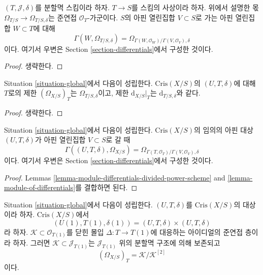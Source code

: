 \begin{lemma}
\label{lemma-module-differentials-divided-power-scheme}
$(T, \mathcal{J}, \delta)$를 분할멱 스킴이라 하자.
$T \to S$를 스킴의 사상이라 하자. 위에서 설명한 몫
$\Omega_{T/S} \to \Omega_{T/S, \delta}$는 준연접
$\mathcal{O}_T$-가군이다. $S$의 아핀 열린집합 $V \subset S$로
가는 아핀 열린집합 $W \subset T$에 대해
$$
\Gamma(W, \Omega_{T/S, \delta}) =
\Omega_{\Gamma(W, \mathcal{O}_W)/\Gamma(V, \mathcal{O}_V), \delta}
$$
이다. 여기서 우변은 Section \ref{section-differentials}에서
구성한 것이다.
\end{lemma}

\begin{proof}
생략한다.
\end{proof}

\begin{lemma}
\label{lemma-module-of-differentials}
Situation \ref{situation-global}에서 다음이 성립한다.
$\text{Cris}(X/S)$의 $(U, T, \delta)$에 대해 $T$로의 제한
$(\Omega_{X/S})_T$는 $\Omega_{T/S, \delta}$이고, 제한
$\text{d}_{X/S}|_T$는 $\text{d}_{T/S, \delta}$와 같다.
\end{lemma}

\begin{proof}
생략한다.
\end{proof}

\begin{lemma}
\label{lemma-module-of-differentials-on-affine}
Situation \ref{situation-global}에서 다음이 성립한다.
$\text{Cris}(X/S)$의 임의의 아핀 대상 $(U, T, \delta)$가
아핀 열린집합 $V \subset S$로 갈 때
$$
\Gamma((U, T, \delta), \Omega_{X/S}) =
\Omega_{\Gamma(T, \mathcal{O}_T)/\Gamma(V, \mathcal{O}_V), \delta}
$$
이다. 여기서 우변은 Section \ref{section-differentials}에서
구성한 것이다.
\end{lemma}

\begin{proof}
Lemmas \ref{lemma-module-differentials-divided-power-scheme} and
\ref{lemma-module-of-differentials}를 결합하면 된다.
\end{proof}

\begin{lemma}
\label{lemma-describe-omega-small}
Situation \ref{situation-global}에서 다음이 성립한다.
$(U, T, \delta)$를 $\text{Cris}(X/S)$의 대상이라 하자.
$\text{Cris}(X/S)$에서
$$
(U(1), T(1), \delta(1)) = (U, T, \delta) \times (U, T, \delta)
$$
라 하자. $\mathcal{K} \subset \mathcal{O}_{T(1)}$를 닫힌 몰입
$\Delta : T \to T(1)$에 대응하는 아이디얼의 준연접 층이라 하자.
그러면
$\mathcal{K} \subset \mathcal{J}_{T(1)}$는 $\mathcal{J}_{T(1)}$ 위의
분할멱 구조에 의해 보존되고
$$
(\Omega_{X/S})_T = \mathcal{K}/\mathcal{K}^{[2]}
$$
이다.
\end{lemma}


